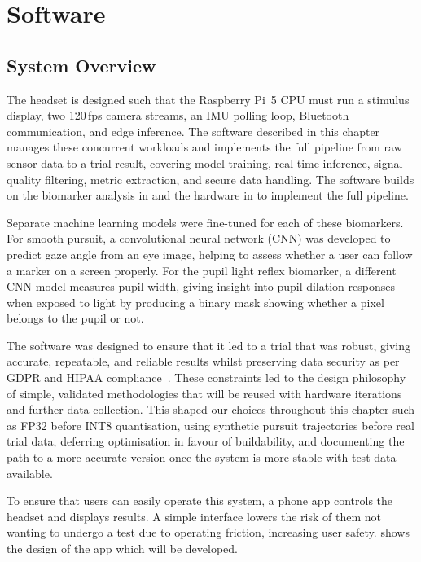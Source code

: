\chapter{Software}
\label{chapter:software}

\section{System Overview}

The headset is designed such that the Raspberry Pi~5 CPU must run a stimulus display, two 120\,fps camera streams, an IMU polling loop, Bluetooth communication, and edge inference. The software described in this chapter manages these concurrent workloads and implements the full pipeline from raw sensor data to a trial result, covering model training, real-time inference, signal quality filtering, metric extraction, and secure data handling. The software builds on the biomarker analysis in  and the hardware in  to implement the full pipeline.

Separate machine learning models were fine-tuned for each of these biomarkers. For smooth pursuit, a convolutional neural network (CNN) was developed to predict gaze angle from an eye image, helping to assess whether a user can follow a marker on a screen properly. For the pupil light reflex biomarker, a different CNN model measures pupil width, giving insight into pupil dilation responses when exposed to light by producing a binary mask showing whether a pixel belongs to the pupil or not.

The software was designed to ensure that it led to a trial that was robust, giving accurate, repeatable, and reliable results whilst preserving data security as per GDPR and HIPAA compliance~\cite{ico_gdpr_minimisation, hhs_hipaa_privacy}. These constraints led to the design philosophy of simple, validated methodologies that will be reused with hardware iterations and further data collection. This shaped our choices throughout this chapter such as FP32 before INT8 quantisation, using synthetic pursuit trajectories before real trial data, deferring optimisation in favour of buildability, and documenting the path to a more accurate version once the system is more stable with test data available.

To ensure that users can easily operate this system, a phone app controls the headset and displays results. A simple interface lowers the risk of them not wanting to undergo a test due to operating friction, increasing user safety.  shows the design of the app which will be developed.

